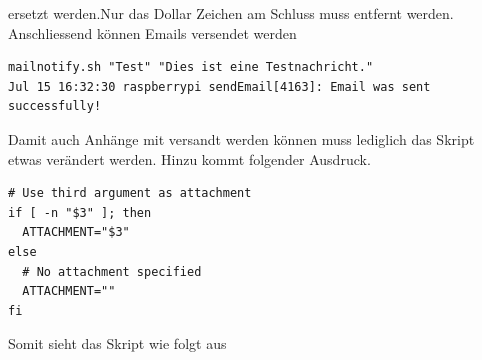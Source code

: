 \documentclass[11pt,a4paper]{article} %
\begin{document}
ersetzt werden.Nur das Dollar Zeichen am Schluss muss entfernt werden. Anschliessend k\"onnen Emails versendet werden
\begin{frame}

\begin{lstlisting}
mailnotify.sh "Test" "Dies ist eine Testnachricht."
Jul 15 16:32:30 raspberrypi sendEmail[4163]: Email was sent successfully!

\end{lstlisting}
\end{frame}
\par
Damit auch Anhänge mit versandt werden können muss lediglich das Skript etwas verändert werden.
Hinzu kommt folgender Ausdruck. \cite{9}
\begin{frame}

\begin{lstlisting}
# Use third argument as attachment
if [ -n "$3" ]; then
  ATTACHMENT="$3"
else
  # No attachment specified
  ATTACHMENT=""
fi

\end{lstlisting}
\end{frame}
\newpage
Somit sieht das Skript wie folgt aus \cite{8}
\end{document}
